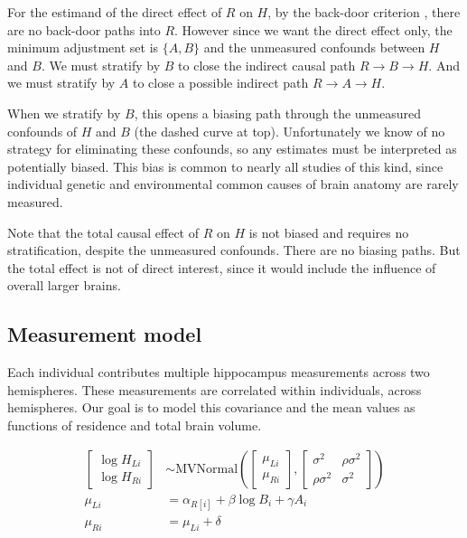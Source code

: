 \documentclass[reqno ,11pt]{amsart}
\begin{document}
For the estimand of the direct effect of $R$ on $H$, by the back-door criterion \citep{Pearl1993}, there are no back-door paths into $R$. However since we want the direct effect only, the minimum adjustment set is $\{A,B\}$ and the unmeasured confounds between $H$ and $B$. We must stratify by $B$ to close the indirect causal path $R \rightarrow B \rightarrow H$. And we must stratify by $A$ to close a possible indirect path $R \rightarrow A \rightarrow H$.

When we stratify by $B$, this opens a biasing path through the unmeasured confounds of $H$ and $B$ (the dashed curve at top). Unfortunately we know of no strategy for eliminating these confounds, so any estimates must be interpreted as potentially biased. This bias is common to nearly all studies of this kind, since individual genetic and environmental common causes of brain anatomy are rarely measured.

Note that the total causal effect of $R$ on $H$ is not biased and requires no stratification, despite the unmeasured confounds. There are no biasing paths. But the total effect is not of direct interest, since it would include the influence of overall larger brains.


\subsection{Measurement model}

Each individual contributes multiple hippocampus measurements across two hemispheres. These measurements are correlated within individuals, across hemispheres. Our goal is to model this covariance and the mean values as functions of residence and total brain volume. 

\begin{align*}
\begin{bmatrix} \log H_{Li} \\ \log H_{Ri} \end{bmatrix}
&\sim \text{MVNormal} \left( 
\begin{bmatrix} \mu_{Li} \\ \mu_{Ri} \end{bmatrix} , 
\begin{bmatrix}
\sigma^2 & \rho \sigma^2 \\
\rho \sigma^2 & \sigma^2 
\end{bmatrix}
\right) \\
\mu_{Li} &= \alpha_{R[i]} + \beta \log B_i + \gamma A_i \\
\mu_{Ri} &= \mu_{Li} + \delta
\end{align*}
\end{document}
